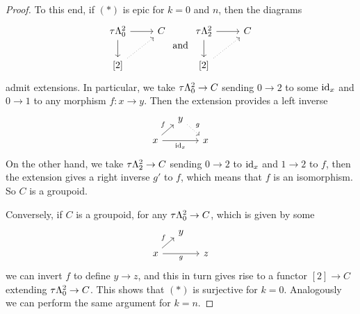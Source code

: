 \documentclass[a4paper,11pt,openany]{scrartcl}
\begin{document}
\begin{proof}
To this end, if $(*)$ is epic for $k=0$ and $n$, then the diagrams
\[
\begin{tikzcd}
\tau\La^2_0\arrow[r]\arrow[d]& C\\
\text{[2]}\arrow[ur,dotted]
\end{tikzcd}
\text{ and }
\begin{tikzcd}
\tau\La^2_2\arrow[r]\arrow[d]& C\\
\text{[2]}\arrow[ur,dotted]
\end{tikzcd}
\]
admit extensions. In particular, we take $\tau\Lambda^2_0\to C$ sending $0\to 2$ to some $\operatorname{id}_x$ and $0\to 1$ to any morphism $f\colon x\to y$. Then the extension provides a left inverse 
\[
\begin{tikzcd}[sep=small]
& y\arrow[dr,dotted,"g"]&\\
x\arrow[rr,"\id_x"']\arrow[ur,"f"]&& x
\end{tikzcd}
\]
On the other hand, we take $\tau\Lambda^2_2\to C$ sending $0\to 2$ to $\operatorname{id}_x$ and $1\to 2$ to $f$, then the extension gives a right inverse $g'$ to $f$, which means that $f$ is an isomorphism. So $C$ is a groupoid.

Conversely, if $C$ is a groupoid, for any $\tau\Lambda^2_0\to C$, which is given by some
\[
\begin{tikzcd}[sep=small]
& y&\\
x\arrow[rr,"g"']\arrow[ur,"f"]&& z
\end{tikzcd}
\]
we can invert $f$ to define $y\to z$, and this in turn gives rise to a functor $[2]\to C$ extending $\tau\Lambda^2_0\to C$. This shows that $(*)$ is surjective for $k=0$. Analogously we can perform the same argument for $k=n$.
\end{proof}
\end{document}
